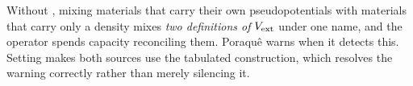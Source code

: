\begin{pwarn}
Without , mixing materials that carry their own
pseudopotentials with materials that carry only a density mixes \emph{two
definitions of} $V_{\mathrm{ext}}$ under one name, and the operator spends
capacity reconciling them. Poraqu\^e warns when it detects this. Setting
 makes both sources use the tabulated construction, which
resolves the warning correctly rather than merely silencing it.
\end{pwarn}
